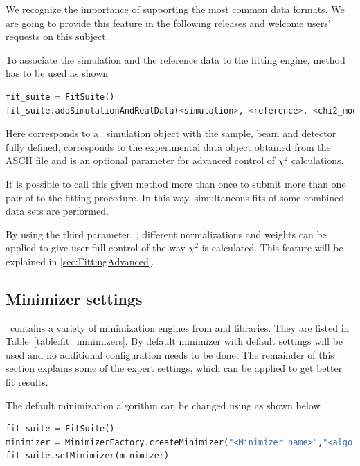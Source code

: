 \Note
{We recognize the importance of supporting the most common data formats. We are going to provide
this feature in the following releases and welcome users' requests on this subject.}

To associate the simulation and the reference data to the fitting engine, method \newline
{} has to be used as shown
\begin{lstlisting}[language=python, style=eclipseboxed,numbers=none]
fit_suite = FitSuite()
fit_suite.addSimulationAndRealData(<simulation>, <reference>, <chi2_module>)
\end{lstlisting}

Here  corresponds to a \BornAgain\ simulation object
with the  sample, beam and detector fully defined, 
corresponds to the experimental data object obtained from the ASCII file and  is an optional parameter for advanced
control of $\chi^2$ calculations.

It is possible to call this given method more than once to submit more than one pair of
 to the fitting procedure.
In this way, simultaneous fits of
some combined data sets are performed.

By using the third parameter, , different normalizations and weights
can be applied to give user full control of the way $\chi^2$ is calculated.
This feature will be explained in \cref{sec:FittingAdvanced}.


\subsection{Minimizer settings}

\BornAgain\ contains a variety of minimization engines from  and 
libraries. They are listed in Table~\ref{table:fit_minimizers}.
By default  minimizer with default settings will be used and no additional
configuration needs to be done.
The remainder of this section explains some of the expert settings, which can be applied to get better
fit results.

The default minimization algorithm can be changed using
 as shown below
\begin{lstlisting}[language=python, style=eclipseboxed,numbers=none]
fit_suite = FitSuite()
minimizer = MinimizerFactory.createMinimizer("<Minimizer name>","<algorithm>")
fit_suite.setMinimizer(minimizer)
\end{lstlisting}

